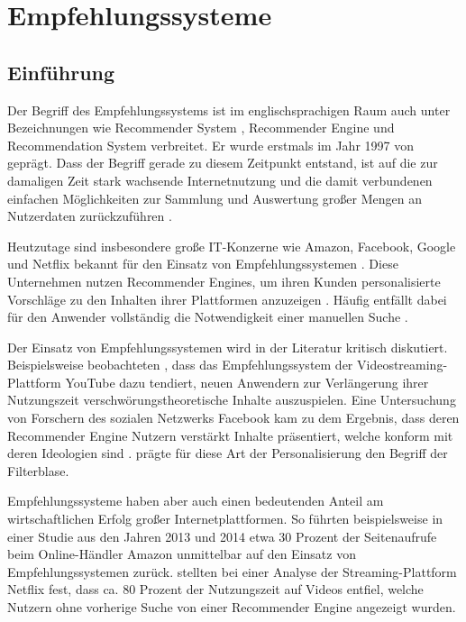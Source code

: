 
\chapter{Empfehlungssysteme}
\label{ch:empfehlungssysteme}

\section{Einführung}
\label{ch:empfehlungssysteme:einfuehrung}
Der Begriff des Empfehlungssystems ist im englischsprachigen Raum auch unter Bezeichnungen wie Recommender System \cite[S. 1]{lu:2015}, Recommender Engine \cite[S. 1]{panigrahi:2016} und Recommendation System \cite[S. 1]{ebesu:2018} verbreitet. Er wurde erstmals im Jahr 1997 von \textcite[S. 1]{resnick:1997} geprägt. Dass der Begriff gerade zu diesem Zeitpunkt entstand, ist auf die zur damaligen Zeit stark wachsende Internetnutzung und die damit verbundenen einfachen Möglichkeiten zur Sammlung und Auswertung großer Mengen an Nutzerdaten zurückzuführen \cite[S. xvii]{recommenderSystems:2016}.

Heutzutage sind insbesondere große IT-Konzerne wie Amazon, Facebook, Google und Netflix bekannt für den Einsatz von Empfehlungssystemen \cite[S. 1]{zarzour:2018}. Diese Unternehmen nutzen Recommender Engines, um ihren Kunden personalisierte Vorschläge zu den Inhalten ihrer Plattformen anzuzeigen \cite[S. 2]{jeckmans:2013}. Häufig entfällt dabei für den Anwender vollständig die Notwendigkeit einer manuellen Suche \cite[S. 1]{comibingCareer:2013}.

Der Einsatz von Empfehlungssystemen wird in der Literatur kritisch diskutiert. Beispielsweise beobachteten \textcite[S. 17f.]{alfano:2020}, dass das Empfehlungssystem der Videostreaming-Plattform YouTube dazu tendiert, neuen Anwendern zur Verlängerung ihrer Nutzungszeit verschwörungstheoretische Inhalte auszuspielen. Eine Untersuchung von Forschern des sozialen Netzwerks Facebook kam zu dem Ergebnis, dass deren Recommender Engine Nutzern verstärkt Inhalte präsentiert, welche konform mit deren Ideologien sind \cite[S. 2]{bakshy:2015}. \textcite[S. 1ff.]{pariser:2012} prägte für diese Art der Personalisierung den Begriff der Filterblase.

Empfehlungssysteme haben aber auch einen bedeutenden Anteil am wirtschaftlichen Erfolg großer Internetplattformen. So führten beispielsweise \textcite[S. 6f.]{sharma:2015} in einer Studie aus den Jahren 2013 und 2014 etwa 30 Prozent der Seitenaufrufe beim Online-Händler Amazon unmittelbar auf den Einsatz von Empfehlungssystemen zurück. \textcite[S. 5]{gomezuribe:2016} stellten bei einer Analyse der Streaming-Plattform Netflix fest, dass ca. 80 Prozent der Nutzungszeit auf Videos entfiel, welche Nutzern ohne vorherige Suche von einer Recommender Engine angezeigt wurden.

